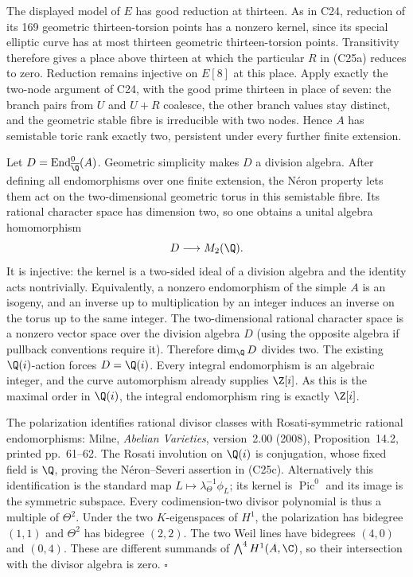 The displayed model of $E$ has good reduction at thirteen.
As in C24, reduction of its 169 geometric thirteen-torsion
points has a nonzero kernel, since its special elliptic
curve has at most thirteen geometric thirteen-torsion
points. Transitivity therefore gives a place above
thirteen at which the particular $R$ in (C25a) reduces
to zero. Reduction remains injective on $E[8]$ at this
place. Apply exactly the two-node argument of C24,
with the good prime thirteen in place of seven:
the branch pairs from $U$ and $U+R$ coalesce, the
other branch values stay distinct, and the geometric
stable fibre is irreducible with two nodes. Hence
$A$ has semistable toric rank exactly two, persistent
under every further finite extension.

Let $D=\operatorname{End}_{\overline\Q}^0(A)$.
Geometric simplicity makes $D$ a division algebra.
After defining all endomorphisms over one finite
extension, the N\'eron property lets them act on the
two-dimensional geometric torus in this semistable
fibre. Its rational character space has dimension two,
so one obtains a unital algebra homomorphism
\[
                    D\longrightarrow M_2(\Q).
\]
It is injective: the kernel is a two-sided ideal of a
division algebra and the identity acts nontrivially.
Equivalently, a nonzero endomorphism of the simple
$A$ is an isogeny, and an inverse up to multiplication
by an integer induces an inverse on the torus up to
the same integer. The two-dimensional rational
character space is a nonzero vector space over the
division algebra $D$ (using the opposite algebra if
pullback conventions require it). Therefore
$\dim_\Q D$ divides two.
The existing $\Q(i)$-action forces $D=\Q(i)$.
Every integral endomorphism is an algebraic integer,
and the curve automorphism already supplies $\Z[i]$.
As this is the maximal order in $\Q(i)$, the integral
endomorphism ring is exactly $\Z[i]$.

The polarization identifies rational divisor classes
with Rosati-symmetric rational endomorphisms: Milne,
\emph{Abelian Varieties}, version~2.00 (2008),
Proposition~14.2, printed pp.~61--62. The
Rosati involution on $\Q(i)$ is conjugation, whose
fixed field is $\Q$, proving the N\'eron--Severi
assertion in (C25c). Alternatively this identification
is the standard map $L\mapsto\lambda_\Theta^{-1}\phi_L$;
its kernel is $\operatorname{Pic}^0$ and its image is
the symmetric subspace.
Every codimension-two divisor polynomial is thus a
multiple of $\Theta^2$. Under the two $K$-eigenspaces
of $H^1$, the polarization has bidegree $(1,1)$ and
$\Theta^2$ has bidegree $(2,2)$. The two Weil lines
have bidegrees $(4,0)$ and $(0,4)$. These are different
summands of $\bigwedge^4H^1(A,\C)$, so their intersection
with the divisor algebra is zero. \hfill$\square$

